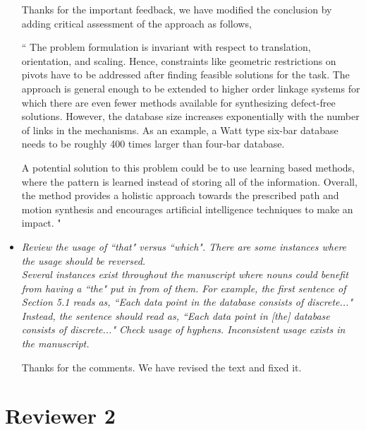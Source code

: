 \documentclass{article}
\begin{document}
\begin{itemize}
Thanks for the important feedback, we have modified the conclusion by adding critical assessment of the approach as follows,

`` The problem formulation is invariant with respect to translation, orientation, and scaling.
Hence, constraints like geometric restrictions on pivots have to be addressed after finding feasible solutions for the task.
The approach is general enough to be extended to higher order linkage systems for which there are even fewer methods available for synthesizing defect-free solutions.
However, the database size increases exponentially with the number of links in the mechanisms.
As an example, a Watt type six-bar database needs to be roughly 400 times larger than four-bar database.

A potential solution to this problem could be to use learning based methods, where the pattern is learned instead of storing all of the information.
Overall, the method provides a holistic approach towards the prescribed path and motion synthesis and encourages artificial intelligence techniques to make an impact.
"

  \item \emph{
 Review the usage of ``that" versus ``which". There are some instances where the usage should be reversed.
 \\
 Several instances exist throughout the manuscript where nouns could benefit from having a ``the" put in from of them. For example, the first sentence of Section 5.1 reads as, ``Each data point in the database consists of discrete..." Instead, the sentence should read as, ``Each data point in [the] database consists of discrete..."
 Check usage of hyphens. Inconsistent usage exists in the manuscript.
 }

 Thanks for the comments. We have revised the text and fixed it.
\\

\end{itemize}

\section{Reviewer 2}
\end{document}
